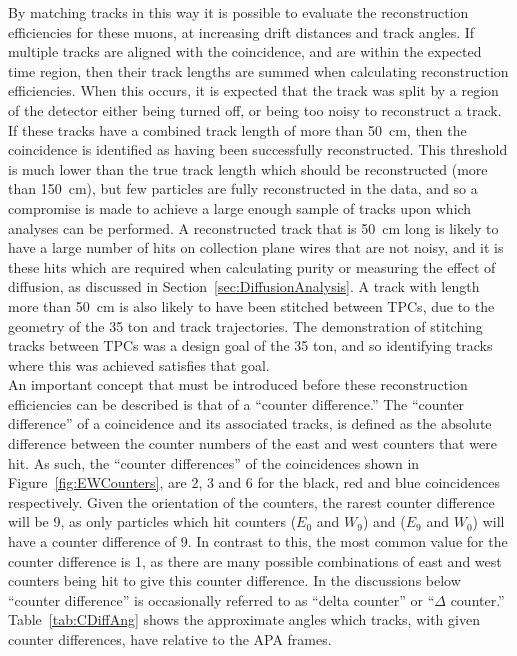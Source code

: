 By matching tracks in this way it is possible to evaluate the reconstruction efficiencies for these muons, at increasing drift distances and track angles. If multiple tracks are aligned with the coincidence, and are within the expected time region, then their track lengths are summed when calculating reconstruction efficiencies. When this occurs, it is expected that the track was split by a region of the detector either being turned off, or being too noisy to reconstruct a track. If these tracks have a combined track length of more than 50~cm, then the coincidence is identified as having been successfully reconstructed. This threshold is much lower than the true track length which should be reconstructed (more than 150~cm), but few particles are fully reconstructed in the data, and so a compromise is made to achieve a large enough sample of tracks upon which analyses can be performed. A reconstructed track that is 50~cm long is likely to have a large number of hits on collection plane wires that are not noisy, and it is these hits which are required when calculating purity or measuring the effect of diffusion, as discussed in Section~\ref{sec:DiffusionAnalysis}. A track with length more than 50~cm is also likely to have been stitched between TPCs, due to the geometry of the 35 ton and track trajectories. The demonstration of stitching tracks between TPCs was a design goal of the 35 ton, and so identifying tracks where this was achieved satisfies that goal. \\

An important concept that must be introduced before these reconstruction efficiencies can be described is that of a ``counter difference.'' The ``counter difference'' of a coincidence and its associated tracks, is defined as the absolute difference between the counter numbers of the east and west counters that were hit. As such, the ``counter differences'' of the coincidences shown in Figure~\ref{fig:EWCounters}, are 2, 3 and 6 for the black, red and blue coincidences respectively. Given the orientation of the counters, the rarest counter difference will be 9, as only particles which hit counters ($E_0$ and $W_9$) and ($E_9$ and $W_0$) will have a counter difference of 9. In contrast to this, the most common value for the counter difference is 1, as there are many possible combinations of east and west counters being hit to give this counter difference. In the discussions below ``counter difference'' is occasionally referred to as ``delta counter'' or ``$\Delta$ counter.'' Table~\ref{tab:CDiffAng} shows the approximate angles which tracks, with given counter differences, have relative to the APA frames. \\


